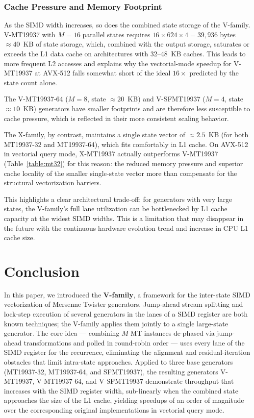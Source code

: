 \documentclass[preprint,1p,times]{elsarticle}
\begin{document}
\subsubsection{Cache Pressure and Memory Footprint}
\label{sec:cachepressure}
As the SIMD width increases, so does the combined state storage of the V-family. V-MT19937 with $M=16$ parallel states requires $16 \times 624 \times 4 = 39{,}936$ bytes $\approx 40$~KB of state storage, which, combined with the output storage, saturates or exceeds the L1 data cache on architectures with 32--48~KB caches. This leads to more frequent L2 accesses and explains why the vectorial-mode speedup for V-MT19937 at AVX-512 falls somewhat short of the ideal $16\times$ predicted by the state count alone.

The V-MT19937-64 ($M=8$, state $\approx 20$~KB) and V-SFMT19937 ($M=4$, state $\approx 10$~KB) generators have smaller footprints and are therefore less susceptible to cache pressure, which is reflected in their more consistent scaling behavior.

The X-family, by contrast, maintains a single state vector of $\approx 2.5$~KB (for both MT19937-32 and MT19937-64), which fits comfortably in L1 cache. On AVX-512 in vectorial query mode, X-MT19937 actually outperforms V-MT19937 (Table~\ref{table:mt32}) for this reason: the reduced memory pressure and superior cache locality of the smaller single-state vector more than compensate for the structural vectorization barriers.

This highlights a clear architectural trade-off: for generators with very large states, the V-family's full lane utilization can be bottlenecked by L1 cache capacity at the widest SIMD widths. This is a limitation that may disappear in the future with the continuous hardware evolution trend and increase in CPU L1 cache size.

\section{Conclusion}
In this paper, we introduced the \textbf{V-family}, a framework for the inter-state SIMD vectorization of Mersenne Twister generators. Jump-ahead stream splitting and lock-step execution of several generators in the lanes of a SIMD register are both known techniques; the V-family applies them jointly to a single large-state generator. The core idea --- combining $M$ MT instances de-phased via jump-ahead transformations and polled in round-robin order --- uses every lane of the SIMD register for the recurrence, eliminating the alignment and residual-iteration obstacles that limit intra-state approaches. Applied to three base generators (MT19937-32, MT19937-64, and SFMT19937), the resulting generators V-MT19937, V-MT19937-64, and V-SFMT19937 demonstrate throughput that increases with the SIMD register width, sub-linearly when the combined state approaches the size of the L1 cache, yielding speedups of an order of magnitude over the corresponding original implementations in vectorial query mode.
\end{document}
